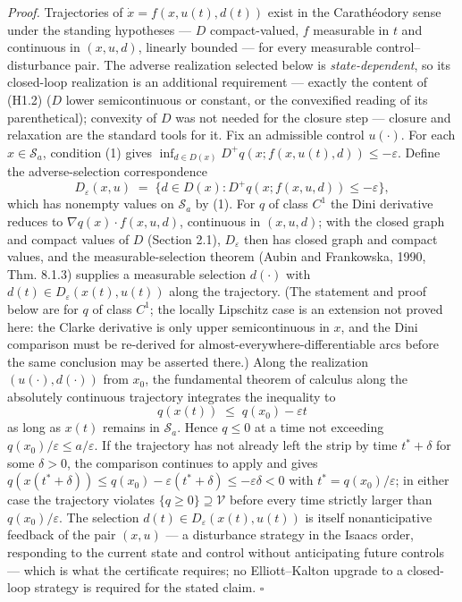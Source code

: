 \documentclass[11pt]{article}
\begin{document}
\emph{Proof.} Trajectories of \(\dot x = f(x, u(t), d(t))\) exist in the
Carath\'eodory sense under the standing hypotheses --- \(D\)
compact-valued, \(f\) measurable in \(t\) and continuous in \((x,u,d)\),
linearly bounded --- for every measurable control--disturbance pair. The
adverse realization selected below is \emph{state-dependent}, so its
closed-loop realization is an additional requirement --- exactly the content of (H1.2) (\(D\) lower semicontinuous or constant, or
the convexified reading of its parenthetical); convexity of \(D\) was
not needed for the closure step --- closure and relaxation are the
standard tools for it. Fix an admissible control \(u(\cdot)\). For each
\(x \in \mathcal{S}_a\), condition (1) gives
\(\inf_{d \in D(x)} D^+ q(x; f(x,u(t),d)) \le -\varepsilon\). Define the
adverse-selection correspondence
\[D_{\varepsilon}(x, u) \;=\; \big\{ d \in D(x) : D^+ q(x; f(x,u,d)) \le -\varepsilon \big\},\]
which has nonempty values on \(\mathcal{S}_a\) by (1). For \(q\) of
class \(C^1\) the Dini derivative reduces to
\(\nabla q(x) \cdot f(x,u,d)\), continuous in \((x,u,d)\); with the
closed graph and compact values of \(D\) (Section 2.1),
\(D_{\varepsilon}\) then has closed graph and compact values, and the
measurable-selection theorem (Aubin and Frankowska, 1990, Thm. 8.1.3)
supplies a measurable selection \(d(\cdot)\) with
\(d(t) \in D_{\varepsilon}(x(t), u(t))\) along the trajectory. (The
statement and proof below are for \(q\) of class \(C^1\); the locally Lipschitz case is an extension not proved here: the Clarke
derivative is only upper semicontinuous in \(x\), and the Dini
comparison must be re-derived for almost-everywhere-differentiable arcs
before the same conclusion may be asserted there.) Along the realization
\((u(\cdot), d(\cdot))\) from \(x_0\), the fundamental theorem of
calculus along the absolutely continuous trajectory integrates the
inequality to \[q(x(t)) \;\le\; q(x_0) - \varepsilon t\] as long as
\(x(t)\) remains in \(\mathcal{S}_a\). Hence \(q \le 0\) at a time not
exceeding \(q(x_0)/\varepsilon \le a/\varepsilon\). If the trajectory
has not already left the strip by time \(t^* + \delta\) for some
\(\delta > 0\), the comparison continues to apply and gives
\(q(x(t^* + \delta)) \le q(x_0) - \varepsilon(t^* + \delta) \le -\varepsilon\delta < 0\)
with \(t^* = q(x_0)/\varepsilon\); in either case the trajectory
violates \(\{ q \ge 0 \} \supseteq \mathcal{V}\) before every time
strictly larger than \(q(x_0)/\varepsilon\). The selection
\(d(t) \in D_\varepsilon(x(t), u(t))\) is itself nonanticipative
feedback of the pair \((x, u)\) --- a disturbance strategy in the Isaacs
order, responding to the current state and control without anticipating
future controls --- which is what the certificate requires; no
Elliott--Kalton upgrade to a closed-loop strategy is required for the
stated claim. \ensuremath{\square}
\end{document}

